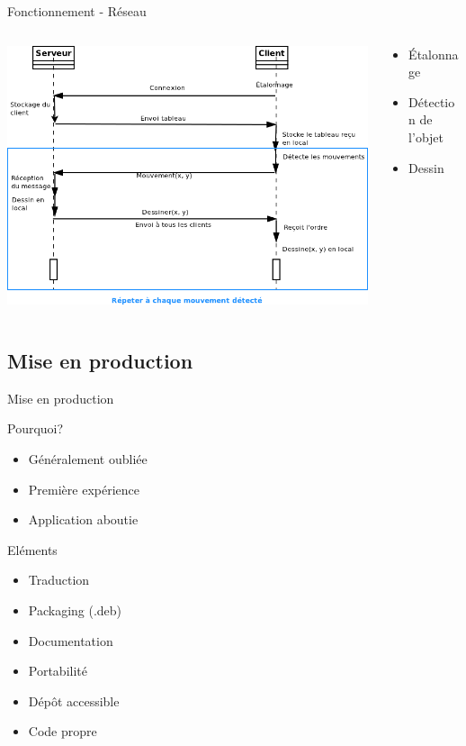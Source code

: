 \documentclass{beamer}
\begin{document}
		\begin{frame}{Fonctionnement - Réseau}
			\begin{columns}
				\begin{column}{9cm}
					\includegraphics[scale=0.35]{sequence_reseau.png}
				\end{column}
				\begin{column}{5cm}
					\begin{itemize}
						\item Étalonnage
						\item Détection de l'objet
						\item Dessin
					\end{itemize}
				\end{column}
			\end{columns}
		\end{frame}
		
		\subsection{Mise en production}
		\begin{frame}{Mise en production}
			\begin{block}{Pourquoi?}
				\begin{itemize}
					\item Généralement oubliée
					\item Première expérience
					\item Application aboutie
				\end{itemize}
			\end{block}
			\begin{block}{Eléments}
				\begin{itemize}
					\item Traduction
					\item Packaging (.deb)
					\item Documentation
					\item Portabilité
					\item Dépôt accessible
					\item Code propre
				\end{itemize}
			\end{block}
		\end{frame}
		
\end{document}
